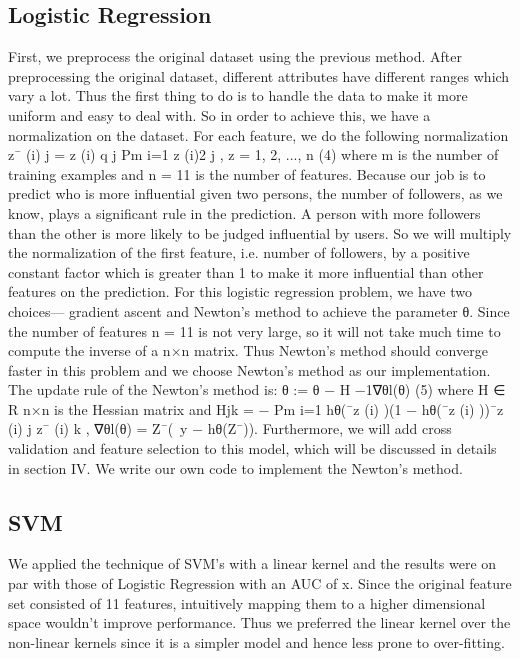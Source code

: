 \documentclass[conference]{IEEEtran}
\numberwithin{equation}{section}
\numberwithin{figure}{section}
\numberwithin{table}{section}
\begin{document}
\subsection{Logistic Regression}\label{sec:colour-illustrations}
First, we preprocess the original dataset using the
previous method. After preprocessing the original
dataset, different attributes have different ranges
which vary a lot. Thus the first thing to do is to
handle the data to make it more uniform and easy
to deal with. So in order to achieve this, we have a
normalization on the dataset. For each feature, we
do the following normalization
z¯
(i)
j =
z
(i)
q
j
Pm
i=1 z
(i)2
j
, z = 1, 2, ..., n (4)
where m is the number of training examples and n = 11 is the number of features. Because our job is to predict who is more influential given two persons, the number of followers, as we know, plays a significant rule in the prediction.
A person with more followers than the other is more likely to be judged influential by users. So we will
multiply the normalization of the first feature, i.e. number of followers, by a positive constant factor
which is greater than 1 to make it more influential than other features on the prediction. For this logistic regression problem, we have two choices— gradient ascent and Newton’s method to achieve the parameter θ. Since the number of
features n = 11 is not very large, so it will not take much time to compute the inverse of a n×n matrix.
Thus Newton’s method should converge faster in this problem and we choose Newton’s method as our implementation. The update rule of the Newton’s method is:
θ := θ − H
−1∇θl(θ) (5)
where H ∈ R
n×n
is the Hessian matrix and Hjk =
−
Pm
i=1 hθ(¯z
(i)
)(1 − hθ(¯z
(i)
))¯z
(i)
j
z¯
(i)
k
, ∇θl(θ) =
Z¯(~y − hθ(Z¯)).
Furthermore, we will add cross validation and feature selection to this model, which will be discussed in details in section IV. We write our own code to implement the Newton’s method.


\subsection{SVM}\label{sec:colour-illustrations}

We applied the technique of SVM's with a linear kernel and the results were on par with those of Logistic Regression with an AUC of x. Since the original feature set consisted of 11 features, intuitively mapping them to a higher dimensional space wouldn't improve performance. Thus we preferred the linear kernel over the non-linear kernels since it is a simpler model and hence less prone to over-fitting. 
\end{document}
